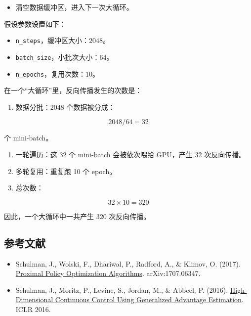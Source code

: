 \begin{itemize}
\tightlist
\item
  清空数据缓冲区，进入下一次大循环。
\end{itemize}

假设参数设置如下：

\begin{itemize}
\tightlist
\item
  \texttt{n\_steps}，缓冲区大小：\(2048\)。
\item
  \texttt{batch\_size}，小批次大小：\(64\)。
\item
  \texttt{n\_epochs}，复用次数：\(10\)。
\end{itemize}

在一个``大循环''里，反向传播发生的次数是：

\begin{enumerate}
\def\labelenumi{\arabic{enumi}.}
\tightlist
\item
  数据分批：2048 个数据被分成：
\end{enumerate}

\[
2048/64=32
\]

个 mini-batch。

\begin{enumerate}
\def\labelenumi{\arabic{enumi}.}
\setcounter{enumi}{1}
\tightlist
\item
  一轮遍历：这 32 个 mini-batch 会被依次喂给 GPU，产生 32 次反向传播。
\item
  多轮复用：重复跑 10 个 epoch。
\item
  总次数：
\end{enumerate}

\[
32\times 10=320
\]

因此，一个大循环中一共产生 320 次反向传播。

\hypertarget{ux53c2ux8003ux6587ux732e-58}{%
\subsection{参考文献}\label{ux53c2ux8003ux6587ux732e-58}}

\vspace{0.25em}
\begin{itemize}
\tightlist
\item
  Schulman, J., Wolski, F., Dhariwal, P., Radford, A., \& Klimov, O. (2017). \href{https://arxiv.org/abs/1707.06347}{Proximal Policy Optimization Algorithms}. arXiv:1707.06347.
\item
  Schulman, J., Moritz, P., Levine, S., Jordan, M., \& Abbeel, P. (2016). \href{https://arxiv.org/abs/1506.02438}{High-Dimensional Continuous Control Using Generalized Advantage Estimation}. ICLR 2016.
\end{itemize}

